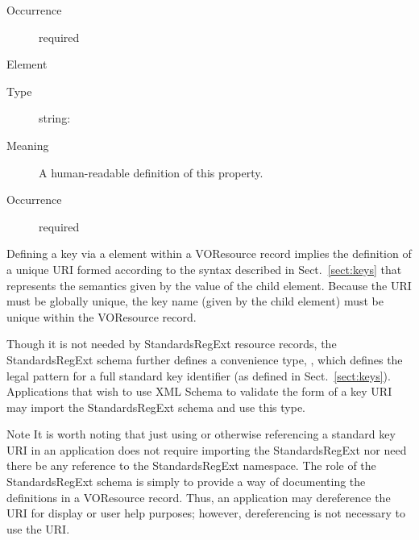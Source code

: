 \documentclass[11pt,a4paper]{ivoa}
\begin{document}
\begin{generated}
\begin{bigdescription}
\begin{description}
\item[Occurrence] required


\end{description}
\item[Element \xmlel{description}]
\begin{description}
\item[Type] string: 
\item[Meaning] 
                  A human-readable definition of this property.  
               
\item[Occurrence] required

\end{description}


\end{bigdescription}\endgroup

\endgroup
\end{generated}



Defining a key via a  element within a
VOResource record implies the definition of a unique URI formed
according to the syntax described in Sect.~\ref{sect:keys}
that represents the semantics given by the value of the 
 child element.  Because the URI must
be globally unique, the key name (given by the
 child element) must be unique within the
VOResource record.

Though it is not needed by StandardsRegExt resource records, the StandardsRegExt
schema further defines a convenience type,
, which defines the legal pattern for
a full standard key identifier (as defined in
Sect.~\ref{sect:keys}).  Applications that wish to use
XML Schema to validate the form of a key URI may import the StandardsRegExt
schema and use this type.  


\begin{admonition}{Note}
It is worth noting that just using or otherwise referencing a
standard key URI in an application does not require importing
the StandardsRegExt nor need there be any reference to the
StandardsRegExt namespace.  The role of the StandardsRegExt schema is
simply to provide a way of documenting the definitions in a
VOResource record.  Thus, an application may dereference the
URI for display or user help purposes; however, dereferencing
is not necessary to use the URI. 
\end{admonition}


\appendix
\end{document}
